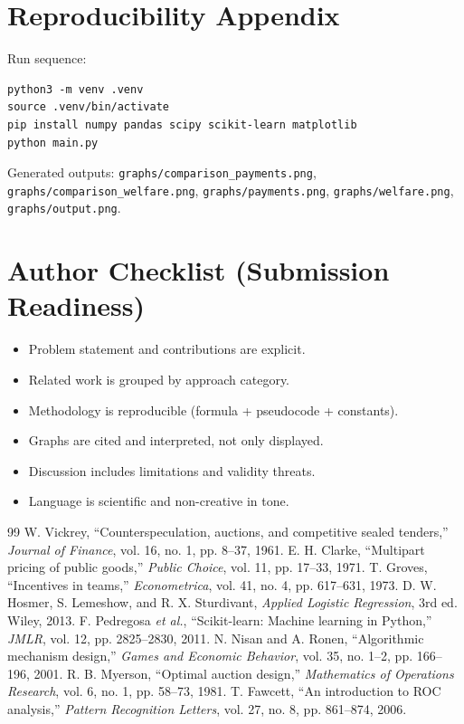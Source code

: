 \documentclass[journal]{IEEEtran}
\begin{document}
\section*{Reproducibility Appendix}
Run sequence:
\begin{verbatim}
python3 -m venv .venv
source .venv/bin/activate
pip install numpy pandas scipy scikit-learn matplotlib
python main.py
\end{verbatim}
Generated outputs:
\texttt{graphs/comparison\_payments.png},
\texttt{graphs/comparison\_welfare.png},
\texttt{graphs/payments.png},
\texttt{graphs/welfare.png},
\texttt{graphs/output.png}.

\section*{Author Checklist (Submission Readiness)}
\begin{itemize}[leftmargin=*]
    \item Problem statement and contributions are explicit.
    \item Related work is grouped by approach category.
    \item Methodology is reproducible (formula + pseudocode + constants).
    \item Graphs are cited and interpreted, not only displayed.
    \item Discussion includes limitations and validity threats.
    \item Language is scientific and non-creative in tone.
\end{itemize}

\begin{thebibliography}{99}
W. Vickrey, ``Counterspeculation, auctions, and competitive sealed tenders,'' \emph{Journal of Finance}, vol. 16, no. 1, pp. 8--37, 1961.
E. H. Clarke, ``Multipart pricing of public goods,'' \emph{Public Choice}, vol. 11, pp. 17--33, 1971.
T. Groves, ``Incentives in teams,'' \emph{Econometrica}, vol. 41, no. 4, pp. 617--631, 1973.
D. W. Hosmer, S. Lemeshow, and R. X. Sturdivant, \emph{Applied Logistic Regression}, 3rd ed. Wiley, 2013.
F. Pedregosa \emph{et al.}, ``Scikit-learn: Machine learning in Python,'' \emph{JMLR}, vol. 12, pp. 2825--2830, 2011.
N. Nisan and A. Ronen, ``Algorithmic mechanism design,'' \emph{Games and Economic Behavior}, vol. 35, no. 1--2, pp. 166--196, 2001.
R. B. Myerson, ``Optimal auction design,'' \emph{Mathematics of Operations Research}, vol. 6, no. 1, pp. 58--73, 1981.
T. Fawcett, ``An introduction to ROC analysis,'' \emph{Pattern Recognition Letters}, vol. 27, no. 8, pp. 861--874, 2006.
\end{thebibliography}
\end{document}
